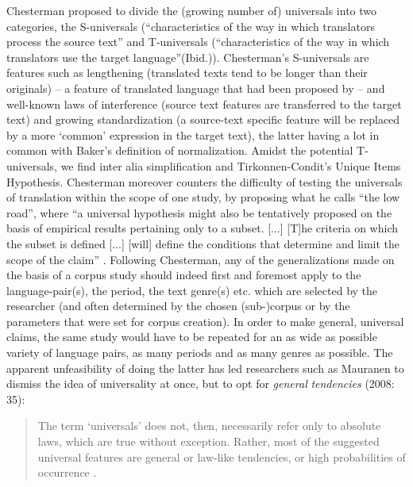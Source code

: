 Chesterman proposed to divide the (growing number of) universals into two categories, the S-universals (“characteristics of the way in which translators process the source text” \citep[39]{gambier_what_2004} and T-universals (“characteristics of the way in which translators use the target language”(Ibid.)). Chesterman’s S-universals are features such as lengthening (translated texts tend to be longer than their originals) – a feature of translated language that had been proposed by  \citet[185]{vinay_stylistique_1958} – and  well-known laws of interference (source text features are transferred to the target text) and growing standardization (a source-text specific feature will be replaced by a more ‘common’ expression in the target text), the latter having a lot in common with Baker’s definition of normalization. Amidst the potential T-universals, we find inter alia simplification and Tirkonnen-Condit’s Unique Items Hypothesis. Chesterman moreover counters the difficulty of testing the universals of translation within the scope of one study, by proposing what he calls “the low road”, where “a universal hypothesis might also be tentatively proposed on the basis of empirical results pertaining only to a subset. [...] [T]he criteria on which the subset is defined [...] [will] define the conditions that determine and limit the scope of the claim” \citep[40]{gambier_what_2004}. Following Chesterman, any of the generalizations made on the basis of a corpus study should indeed first and foremost apply to the language-pair(s), the period, the text genre(s) etc. which are selected by the researcher (and often determined by the chosen (sub-)corpus or by the parameters that were set for corpus creation). In order to make general, universal claims, the same study would have to be repeated for an as wide as possible variety of language pairs, as many periods and as many genres as possible. The apparent unfeasibility of doing the latter has led researchers such as Mauranen to dismiss the idea of universality at once, but to opt for \textit{general} \textit{tendencies} (2008: 35):


\begin{quote}
The term ‘universals’ does not, then, necessarily refer only to absolute laws, which are true without exception. Rather, most of the suggested universal features are general or law-like tendencies, or high probabilities of occurrence \citep[35]{anderman_universal_2008}.
\end{quote}


